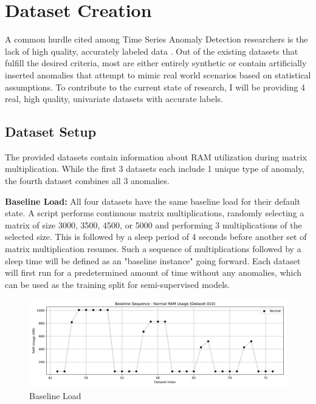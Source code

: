 \documentclass[12pt,oneside]{article}
\begin{document}
\section{Dataset Creation}
A common hurdle cited among Time Series Anomaly Detection researchers is the lack of high quality, accurately labeled data \parencites[p.~2]{liu2024elephant}[p.~1-6]{wu2021current}[p.~1]{paparrizos2022tsb}. Out of the existing datasets that fulfill the desired criteria, most are either entirely synthetic or contain artificially inserted anomalies that attempt to mimic real world scenarios based on statistical assumptions. To contribute to the current state of research, I will be providing 4 real, high quality, univariate datasets with accurate labels. \par

\subsection{Dataset Setup}
The provided datasets contain information about RAM utilization during matrix multiplication. While the first 3 datasets each include 1 unique type of anomaly, the fourth dataset combines all 3 anomalies. \par
\textbf{Baseline Load:} All four datasets have the same baseline load for their default state. A script performs continuous matrix multiplications, randomly selecting a matrix of size 3000, 3500, 4500, or 5000 and performing 3 multiplications of the selected size. This is followed by a sleep period of 4 seconds before another set of matrix multiplication resumes. Such a sequence of multiplications followed by a sleep time will be defined as an "baseline instance" going forward. Each dataset will first run for a predetermined amount of time without any anomalies, which can be used as the training split for semi-supervised models.

\begin{figure}[H] %
    \centering %
    \includegraphics[width=\textwidth]{baseline_sequence}
    \caption{Baseline Load}
    \label{fig:baseline} %
\end{figure}
\end{document}
